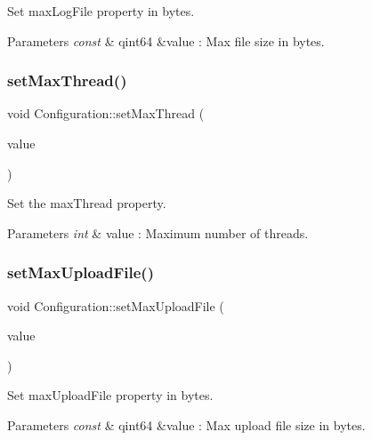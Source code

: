Set max\+Log\+File property in bytes. 


\begin{DoxyParams}{Parameters}
{\em const} & qint64 \&value \+: Max file size in bytes. \\
\hline
\end{DoxyParams}
\mbox{\label{class_configuration_ab242af54d85d49b88b778a50a77949a5}} 
\subsubsection{\texorpdfstring{set\+Max\+Thread()}{setMaxThread()}}
{\footnotesize\ttfamily void Configuration\+::set\+Max\+Thread (\begin{DoxyParamCaption}\item[{int}]{value }\end{DoxyParamCaption})}



Set the max\+Thread property. 


\begin{DoxyParams}{Parameters}
{\em int} & value \+: Maximum number of threads. \\
\hline
\end{DoxyParams}
\mbox{\label{class_configuration_ada37d2f25a05d7b9fa5676f824b7e3be}} 
\subsubsection{\texorpdfstring{set\+Max\+Upload\+File()}{setMaxUploadFile()}}
{\footnotesize\ttfamily void Configuration\+::set\+Max\+Upload\+File (\begin{DoxyParamCaption}\item[{const qint64 \&}]{value }\end{DoxyParamCaption})}



Set max\+Upload\+File property in bytes. 


\begin{DoxyParams}{Parameters}
{\em const} & qint64 \&value \+: Max upload file size in bytes. \\
\hline
\end{DoxyParams}
\mbox{\label{class_configuration_ade67019de7f09f22093d920fc30152e5}} 
